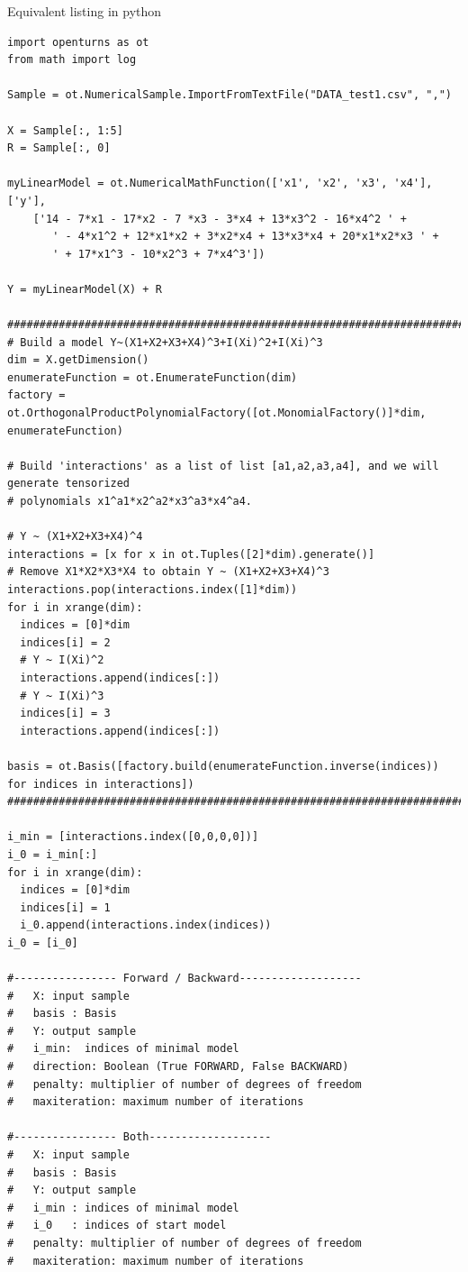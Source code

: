 \newpage
Equivalent listing in python
\begin{lstlisting}[style=pythonStyle,basicstyle=\tiny]
import openturns as ot
from math import log

Sample = ot.NumericalSample.ImportFromTextFile("DATA_test1.csv", ",")

X = Sample[:, 1:5]
R = Sample[:, 0]

myLinearModel = ot.NumericalMathFunction(['x1', 'x2', 'x3', 'x4'], ['y'],
    ['14 - 7*x1 - 17*x2 - 7 *x3 - 3*x4 + 13*x3^2 - 16*x4^2 ' +
       ' - 4*x1^2 + 12*x1*x2 + 3*x2*x4 + 13*x3*x4 + 20*x1*x2*x3 ' +
       ' + 17*x1^3 - 10*x2^3 + 7*x4^3'])

Y = myLinearModel(X) + R

################################################################################################
# Build a model Y~(X1+X2+X3+X4)^3+I(Xi)^2+I(Xi)^3
dim = X.getDimension()
enumerateFunction = ot.EnumerateFunction(dim)
factory = ot.OrthogonalProductPolynomialFactory([ot.MonomialFactory()]*dim, enumerateFunction)

# Build 'interactions' as a list of list [a1,a2,a3,a4], and we will generate tensorized
# polynomials x1^a1*x2^a2*x3^a3*x4^a4.

# Y ~ (X1+X2+X3+X4)^4
interactions = [x for x in ot.Tuples([2]*dim).generate()]
# Remove X1*X2*X3*X4 to obtain Y ~ (X1+X2+X3+X4)^3
interactions.pop(interactions.index([1]*dim))
for i in xrange(dim):
  indices = [0]*dim
  indices[i] = 2
  # Y ~ I(Xi)^2
  interactions.append(indices[:])
  # Y ~ I(Xi)^3
  indices[i] = 3
  interactions.append(indices[:])

basis = ot.Basis([factory.build(enumerateFunction.inverse(indices)) for indices in interactions])
################################################################################################

i_min = [interactions.index([0,0,0,0])]
i_0 = i_min[:]
for i in xrange(dim):
  indices = [0]*dim
  indices[i] = 1
  i_0.append(interactions.index(indices))
i_0 = [i_0]

#---------------- Forward / Backward------------------- 
#   X: input sample
#   basis : Basis
#   Y: output sample
#   i_min:  indices of minimal model
#   direction: Boolean (True FORWARD, False BACKWARD)
#   penalty: multiplier of number of degrees of freedom
#   maxiteration: maximum number of iterations

#---------------- Both------------------- 
#   X: input sample
#   basis : Basis
#   Y: output sample
#   i_min : indices of minimal model
#   i_0   : indices of start model
#   penalty: multiplier of number of degrees of freedom
#   maxiteration: maximum number of iterations


\end{lstlisting}
